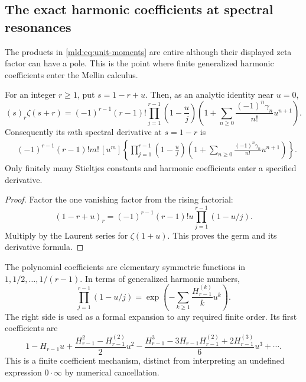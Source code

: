 \subsection{The exact harmonic coefficients at spectral resonances}

The products in \eqref{mld:eq:unit-moments} are entire although their displayed zeta factor can have a pole. This is the point where finite generalized harmonic coefficients enter the Mellin calculus.

\begin{proposition}\label{mld:prop:spectral-cancellation}
For an integer $r\ge1$, put $s=1-r+u$. Then, as an analytic identity near $u=0$,
\begin{equation}\label{mld:eq:cancelled-zeta-germ}
 (s)_r\zeta(s+r)=(-1)^{r-1}(r-1)!
       \prod_{j=1}^{r-1}\left(1-\frac uj\right)
       \left(1+\sum_{n\ge0}\frac{(-1)^n\gamma_n}{n!}u^{n+1}\right).
\end{equation}
Consequently its $m$th spectral derivative at $s=1-r$ is
\begin{align}\label{mld:eq:cancelled-zeta-derivative}
 &(-1)^{r-1}(r-1)!m!\,[u^m]
       \left\{\prod_{j=1}^{r-1}\left(1-\frac uj\right)
       \left(1+\sum_{n\ge0}\frac{(-1)^n\gamma_n}{n!}u^{n+1}\right)\right\}.
\end{align}
Only finitely many Stieltjes constants and harmonic coefficients enter a specified derivative.
\end{proposition}
\begin{proof}
Factor the one vanishing factor from the rising factorial:
\[
 (1-r+u)_r=(-1)^{r-1}(r-1)!u
                         \prod_{j=1}^{r-1}(1-u/j).
\]
Multiply by the Laurent series for $\zeta(1+u)$. This proves the germ and its derivative formula.
\end{proof}

The polynomial coefficients are elementary symmetric functions in
$1,1/2,\ldots,1/(r-1)$. In terms of generalized harmonic numbers,
\[
 \prod_{j=1}^{r-1}(1-u/j)
 =\exp\!\left(-\sum_{k\ge1}\frac{H_{r-1}^{(k)}}{k}u^k\right).
\]
The right side is used as a formal expansion to any required finite order. Its first coefficients are
\[
 1-H_{r-1}u+
 \frac{H_{r-1}^2-H_{r-1}^{(2)}}2u^2
 -\frac{H_{r-1}^3-3H_{r-1}H_{r-1}^{(2)}+2H_{r-1}^{(3)}}6u^3+\cdots.
\]
This is a finite coefficient mechanism, distinct from interpreting an undefined expression $0\cdot\infty$ by numerical cancellation.

